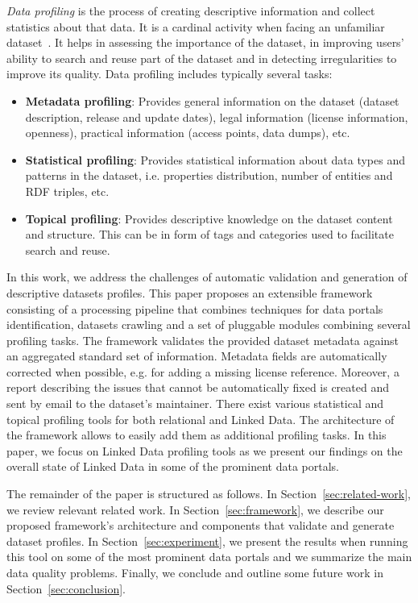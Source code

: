 \documentclass[runningheads,a4paper]{llncs}
\begin{document}
\textit{Data profiling} is the process of creating descriptive information and collect statistics about that data. It is a cardinal activity when facing an unfamiliar dataset~\cite{semwebprofiling}. It helps in assessing the importance of the dataset, in improving users' ability to search and reuse part of the dataset and in detecting irregularities to improve its quality. Data profiling includes typically several tasks:
\begin{itemize}
  \item \textbf{Metadata profiling}: Provides general information on the dataset (dataset description, release and update dates), legal information (license information, openness), practical information (access points, data dumps), etc.
  \item \textbf{Statistical profiling}: Provides statistical information about data types and patterns in the dataset, i.e. properties distribution, number of entities and RDF triples, etc.
  \item \textbf{Topical profiling}: Provides descriptive knowledge on the dataset content and structure. This can be in form of tags and categories used to facilitate search and reuse.
\end{itemize}

In this work, we address the challenges of automatic validation and generation of descriptive datasets profiles. This paper proposes an extensible framework consisting of a processing pipeline that combines techniques for data portals identification, datasets crawling and a set of pluggable modules combining several profiling tasks. The framework validates the provided dataset metadata against an aggregated standard set of information. Metadata fields are automatically corrected when possible, e.g. for adding a missing license reference. Moreover, a report describing the issues that cannot be automatically fixed is created and sent by email to the dataset's maintainer. There exist various statistical and topical profiling tools for both relational and Linked Data. The architecture of the framework allows to easily add them as additional profiling tasks. In this paper, we focus on Linked Data profiling tools as we present our findings on the overall state of Linked Data in some of the prominent data portals.

The remainder of the paper is structured as follows. In Section~\ref{sec:related-work}, we review relevant related work. In Section~\ref{sec:framework}, we describe our proposed framework's architecture and components that validate and generate dataset profiles. In Section~\ref{sec:experiment}, we present the results when running this tool on some of the most prominent data portals and we summarize the main data quality problems. Finally, we conclude and outline some future work in Section~\ref{sec:conclusion}.
\end{document}

